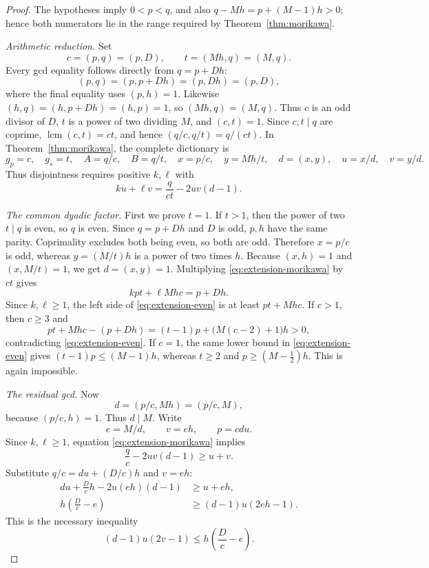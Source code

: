 \documentclass[11pt]{article}
\theoremstyle{definition}
\theoremstyle{remark}
\begin{document}
\begin{proof}
The hypotheses imply \(0<p<q\), and also
\(q-Mh=p+(M-1)h>0\); hence both numerators lie in the range required by
Theorem~\ref{thm:morikawa}.

\smallskip
\noindent\emph{Arithmetic reduction.}
Set
\[
 c=(p,q)=(p,D),\qquad t=(Mh,q)=(M,q).
\]
Every gcd equality follows directly from \(q=p+Dh\):
\[
 (p,q)=(p,p+Dh)=(p,Dh)=(p,D),
\]
where the final equality uses \((p,h)=1\).  Likewise
\((h,q)=(h,p+Dh)=(h,p)=1\), so \((Mh,q)=(M,q)\).
Thus \(c\) is an odd divisor of \(D\), \(t\) is a power of two dividing
\(M\), and \((c,t)=1\).  Since \(c,t\mid q\) are coprime,
\(\operatorname{lcm}(c,t)=ct\), and hence
\((q/c,q/t)=q/(ct)\).  In Theorem~\ref{thm:morikawa}, the complete
dictionary is
\[
 g_p=c,\quad g_s=t,\quad A=q/c,\quad B=q/t,
 \quad x=p/c,\quad y=Mh/t,
 \quad d=(x,y),\quad u=x/d,\quad v=y/d.
\]
Thus disjointness requires positive \(k,\ell\)
with
\begin{equation}\label{eq:extension-morikawa}
 ku+\ell v=\frac{q}{ct}-2uv(d-1).
\end{equation}

\smallskip
\noindent\emph{The common dyadic factor.}
First we prove \(t=1\).  If \(t>1\), then the power of two \(t\mid q\)
is even, so \(q\) is even.  Since \(q=p+Dh\) and \(D\) is odd,
\(p,h\) have the same parity.  Coprimality excludes both being even, so
both are odd.  Therefore \(x=p/c\) is odd, whereas
\(y=(M/t)h\) is a power of two times \(h\).  Because
\((x,h)=1\) and \((x,M/t)=1\), we get \(d=(x,y)=1\).  Multiplying
\eqref{eq:extension-morikawa} by \(ct\) gives
\begin{equation}\label{eq:extension-even}
 kpt+\ell Mhc=p+Dh.
\end{equation}
Since \(k,\ell\ge1\), the left side of \eqref{eq:extension-even} is at
least \(pt+Mhc\).  If \(c>1\), then \(c\ge3\) and
\[
 pt+Mhc-(p+Dh)
 =(t-1)p+\bigl(M(c-2)+1\bigr)h>0,
\]
contradicting \eqref{eq:extension-even}.  If \(c=1\), the same lower bound
in \eqref{eq:extension-even} gives
\((t-1)p\le(M-1)h\), whereas \(t\ge2\) and
\(p\ge(M-\tfrac12)h\).  This is again impossible.

\smallskip
\noindent\emph{The residual gcd.}
Now
\[
 d=(p/c,Mh)=(p/c,M),
\]
because \((p/c,h)=1\).  Thus \(d\mid M\).  Write
\[
 e=M/d,\qquad v=eh,\qquad p=cdu.
\]
Since \(k,\ell\ge1\), equation \eqref{eq:extension-morikawa} implies
\[
 \frac qc-2uv(d-1)\ge u+v.
\]
Substitute \(q/c=du+(D/c)h\) and \(v=eh\):
\begin{align*}
 du+\frac Dc h-2u(eh)(d-1)&\ge u+eh,\\
 h\left(\frac Dc-e\right)&\ge(d-1)u(2eh-1).
\end{align*}
This is the necessary inequality
\begin{equation}\label{eq:extension-necessary}
 (d-1)u(2v-1)\le h\left(\frac Dc-e\right).
\end{equation}


\end{proof}
\end{document}
